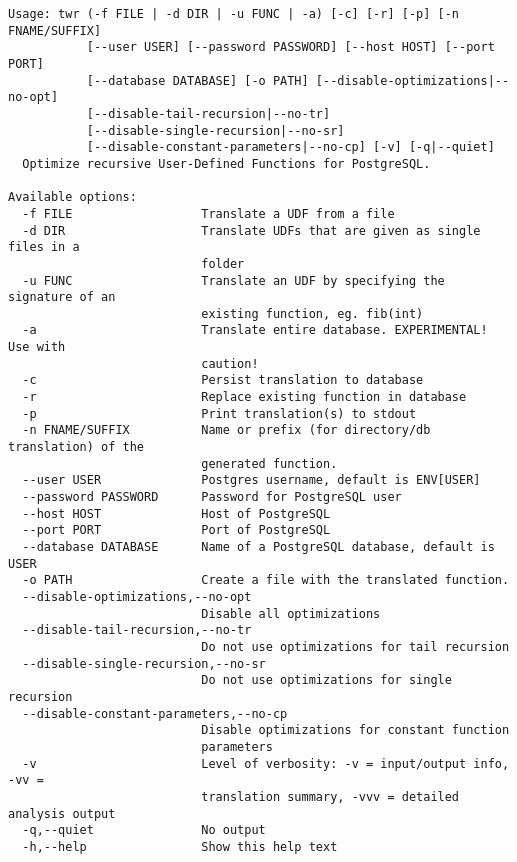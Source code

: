 \scriptsize
\begin{verbatim}
Usage: twr (-f FILE | -d DIR | -u FUNC | -a) [-c] [-r] [-p] [-n FNAME/SUFFIX]
           [--user USER] [--password PASSWORD] [--host HOST] [--port PORT]
           [--database DATABASE] [-o PATH] [--disable-optimizations|--no-opt]
           [--disable-tail-recursion|--no-tr]
           [--disable-single-recursion|--no-sr]
           [--disable-constant-parameters|--no-cp] [-v] [-q|--quiet]
  Optimize recursive User-Defined Functions for PostgreSQL.

Available options:
  -f FILE                  Translate a UDF from a file
  -d DIR                   Translate UDFs that are given as single files in a
                           folder
  -u FUNC                  Translate an UDF by specifying the signature of an
                           existing function, eg. fib(int)
  -a                       Translate entire database. EXPERIMENTAL! Use with
                           caution!
  -c                       Persist translation to database
  -r                       Replace existing function in database
  -p                       Print translation(s) to stdout
  -n FNAME/SUFFIX          Name or prefix (for directory/db translation) of the
                           generated function.
  --user USER              Postgres username, default is ENV[USER]
  --password PASSWORD      Password for PostgreSQL user
  --host HOST              Host of PostgreSQL
  --port PORT              Port of PostgreSQL
  --database DATABASE      Name of a PostgreSQL database, default is USER
  -o PATH                  Create a file with the translated function.
  --disable-optimizations,--no-opt
                           Disable all optimizations
  --disable-tail-recursion,--no-tr
                           Do not use optimizations for tail recursion
  --disable-single-recursion,--no-sr
                           Do not use optimizations for single recursion
  --disable-constant-parameters,--no-cp
                           Disable optimizations for constant function
                           parameters
  -v                       Level of verbosity: -v = input/output info, -vv =
                           translation summary, -vvv = detailed analysis output
  -q,--quiet               No output
  -h,--help                Show this help text
\end{verbatim}